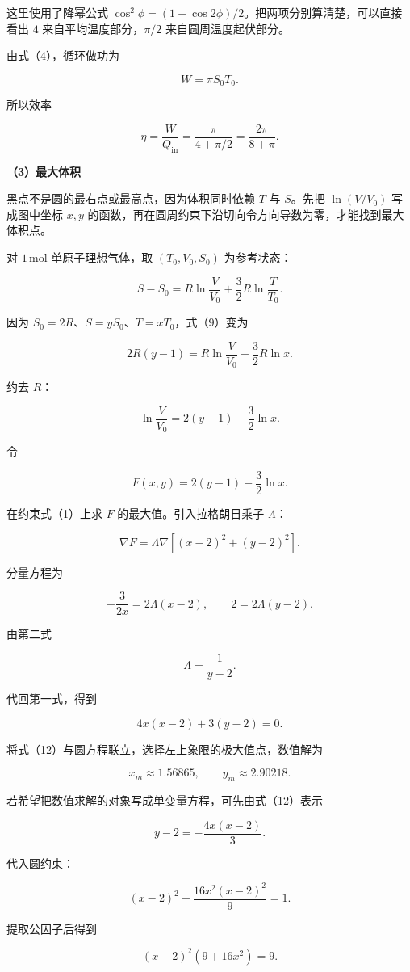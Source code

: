 \documentclass[12pt,a4paper,UTF8]{ctexart}
\begin{document}
这里使用了降幂公式
\(\cos^2\phi=(1+\cos2\phi)/2\)。把两项分别算清楚，可以直接看出 \(4\)
来自平均温度部分，\(\pi/2\) 来自圆周温度起伏部分。

由式（4），循环做功为

\[W=\pi S_0T_0. \tag{7}\]

所以效率

\[\boxed{
\eta=\frac{W}{Q_{\mathrm{in}}}
=\frac{\pi}{4+\pi/2}
=\frac{2\pi}{8+\pi}
}. \tag{8}\]

\textbf{（3）最大体积}

黑点不是圆的最右点或最高点，因为体积同时依赖 \(T\) 与 \(S\)。先把
\(\ln(V/V_0)\) 写成图中坐标 \(x,y\)
的函数，再在圆周约束下沿切向令方向导数为零，才能找到最大体积点。

对 \(1\,\mathrm{mol}\) 单原子理想气体，取 \((T_0,V_0,S_0)\) 为参考状态：

\[S-S_0=R\ln\frac{V}{V_0}+\frac32R\ln\frac{T}{T_0}. \tag{9}\]

因为 \(S_0=2R\)、\(S=yS_0\)、\(T=xT_0\)，式（9）变为

\[2R(y-1)=R\ln\frac{V}{V_0}+\frac32R\ln x.\]

约去 \(R\)：

\[\ln\frac{V}{V_0}=2(y-1)-\frac32\ln x. \tag{10}\]

令

\[F(x,y)=2(y-1)-\frac32\ln x.\]

在约束式（1）上求 \(F\) 的最大值。引入拉格朗日乘子 \(\Lambda\)：

\[\nabla F=\Lambda\nabla[(x-2)^2+(y-2)^2].\]

分量方程为

\[-\frac{3}{2x}=2\Lambda(x-2),\qquad
2=2\Lambda(y-2). \tag{11}\]

由第二式

\[\Lambda=\frac1{y-2}.\]

代回第一式，得到

\[4x(x-2)+3(y-2)=0. \tag{12}\]

将式（12）与圆方程联立，选择左上象限的极大值点，数值解为

\[x_m\approx1.56865,\qquad y_m\approx2.90218. \tag{13}\]

若希望把数值求解的对象写成单变量方程，可先由式（12）表示

\[y-2=-\frac{4x(x-2)}{3}.\]

代入圆约束：

\[ (x-2)^2+\frac{16x^2(x-2)^2}{9}=1.\]

提取公因子后得到

\[ (x-2)^2(9+16x^2)=9. \tag{13a}\]
\end{document}
